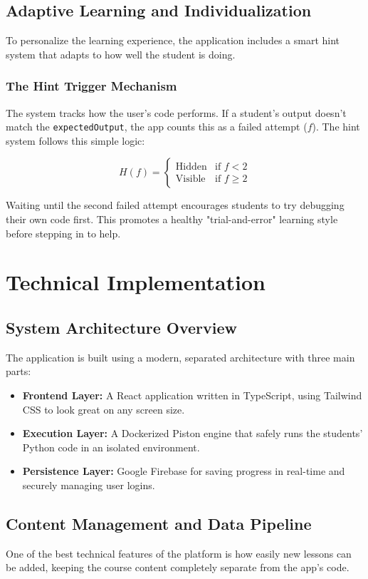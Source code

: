 \documentclass[12pt]{report}
\begin{document}
\section{Adaptive Learning and Individualization}
To personalize the learning experience, the application includes a smart hint system that adapts to how well the student is doing.

\subsection{The Hint Trigger Mechanism}
The system tracks how the user's code performs. If a student's output doesn't match the \texttt{expectedOutput}, the app counts this as a failed attempt ($f$). The hint system follows this simple logic:

\[
H(f) = 
\begin{cases} 
\text{Hidden} & \text{if } f < 2 \\
\text{Visible} & \text{if } f \geq 2 
\end{cases}
\]

Waiting until the second failed attempt encourages students to try debugging their own code first. This promotes a healthy "trial-and-error" learning style before stepping in to help.


\chapter{Technical Implementation}

\section{System Architecture Overview}
The application is built using a modern, separated architecture with three main parts:
\begin{itemize}
\item \textbf{Frontend Layer:} A React application written in TypeScript, using Tailwind CSS to look great on any screen size.
\item \textbf{Execution Layer:} A Dockerized Piston engine that safely runs the students' Python code in an isolated environment.
\item \textbf{Persistence Layer:} Google Firebase for saving progress in real-time and securely managing user logins.
\end{itemize}

\section{Content Management and Data Pipeline}
One of the best technical features of the platform is how easily new lessons can be added, keeping the course content completely separate from the app's code.
\end{document}
